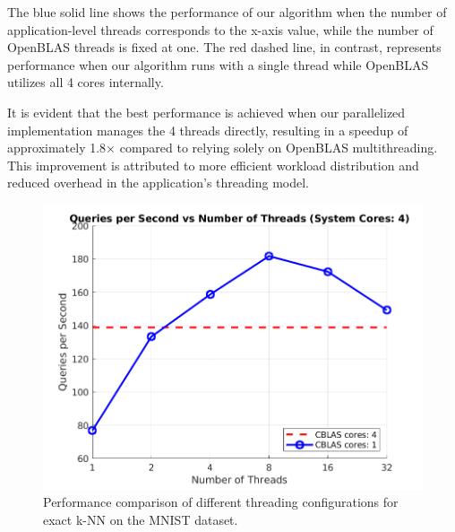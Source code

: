 \documentclass[conference]{IEEEtran}
\begin{document}
The blue solid line shows the performance of our algorithm when the number of application-level threads corresponds
to the x-axis value, while the number of OpenBLAS threads is fixed at one. The red dashed line, in contrast, 
represents performance when our algorithm runs with a single thread while OpenBLAS utilizes all 4 cores internally.

It is evident that the best performance is achieved when our parallelized implementation manages the 4 threads 
directly, resulting in a speedup of approximately 1.8× compared to relying solely on OpenBLAS multithreading. 
This improvement is attributed to more efficient workload distribution and reduced overhead in the application's 
threading model.

\begin{figure}
\centering
\includegraphics[width=1\linewidth]{figures/knn_benchmarks.png}
\caption{Performance comparison of different threading configurations for exact k-NN on the MNIST dataset.}
\label{fig:knn_benchmarks}
\end{figure}



\end{document}
